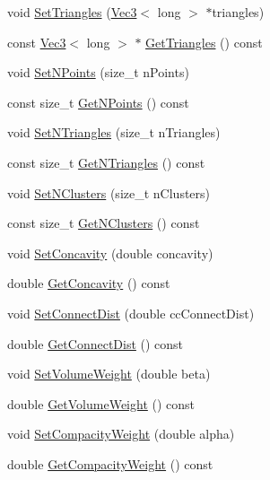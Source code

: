 \begin{DoxyCompactItemize}
void \hyperlink{class_h_a_c_d_1_1_h_a_c_d_a58e438e2251f4fd02b625383e637638d}{Set\+Triangles} (\hyperlink{class_h_a_c_d_1_1_vec3}{Vec3}$<$ long $>$ $\ast$triangles)
\item 
const \hyperlink{class_h_a_c_d_1_1_vec3}{Vec3}$<$ long $>$ $\ast$ \hyperlink{class_h_a_c_d_1_1_h_a_c_d_aa726a99df2ca7a8273e9d5c77d8c54b5}{Get\+Triangles} () const 
\item 
void \hyperlink{class_h_a_c_d_1_1_h_a_c_d_a5740ae0273b1fc040fbafc28a5456936}{Set\+N\+Points} (size\+\_\+t n\+Points)
\item 
const size\+\_\+t \hyperlink{class_h_a_c_d_1_1_h_a_c_d_a3f8bf9642e36902ea14933bcf764aba5}{Get\+N\+Points} () const 
\item 
void \hyperlink{class_h_a_c_d_1_1_h_a_c_d_af1f0345b39497d1448204c56335872e2}{Set\+N\+Triangles} (size\+\_\+t n\+Triangles)
\item 
const size\+\_\+t \hyperlink{class_h_a_c_d_1_1_h_a_c_d_a13a174c40da96bcc5f0d352214683a49}{Get\+N\+Triangles} () const 
\item 
void \hyperlink{class_h_a_c_d_1_1_h_a_c_d_a08384f0267e2bde8a3fe0bbe6d8f371b}{Set\+N\+Clusters} (size\+\_\+t n\+Clusters)
\item 
const size\+\_\+t \hyperlink{class_h_a_c_d_1_1_h_a_c_d_a2279e1acac638c6204a423d3ce325016}{Get\+N\+Clusters} () const 
\item 
void \hyperlink{class_h_a_c_d_1_1_h_a_c_d_a65250437760f715b395dcc8b89f067c8}{Set\+Concavity} (double concavity)
\item 
double \hyperlink{class_h_a_c_d_1_1_h_a_c_d_abfba8986c9cebc43fed7b6052a6a6974}{Get\+Concavity} () const 
\item 
void \hyperlink{class_h_a_c_d_1_1_h_a_c_d_a998981fd43b72ad6df9b73eae98278c3}{Set\+Connect\+Dist} (double cc\+Connect\+Dist)
\item 
double \hyperlink{class_h_a_c_d_1_1_h_a_c_d_af8b7f4d5b01038dac19cc7cb934eed84}{Get\+Connect\+Dist} () const 
\item 
void \hyperlink{class_h_a_c_d_1_1_h_a_c_d_a6b424dea28071f87eaa9d8723e3d054f}{Set\+Volume\+Weight} (double beta)
\item 
double \hyperlink{class_h_a_c_d_1_1_h_a_c_d_a55e4a0f7e76da4e04cea0e41826ea9f9}{Get\+Volume\+Weight} () const 
\item 
void \hyperlink{class_h_a_c_d_1_1_h_a_c_d_acbb98a45d321ac15533b78ca466f681b}{Set\+Compacity\+Weight} (double alpha)
\item 
double \hyperlink{class_h_a_c_d_1_1_h_a_c_d_a56e2cb34d9c25f015e64e0d337e68f60}{Get\+Compacity\+Weight} () const 

\end{DoxyCompactItemize}
